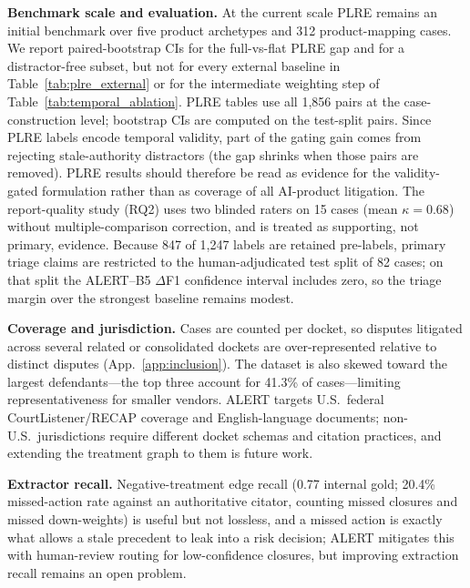 \textbf{Benchmark scale and evaluation.} At the current scale PLRE remains an initial benchmark over five product archetypes and 312 product-mapping cases. We report paired-bootstrap CIs for the full-vs-flat PLRE gap and for a distractor-free subset, but not for every external baseline in Table~\ref{tab:plre_external} or for the intermediate weighting step of Table~\ref{tab:temporal_ablation}. PLRE tables use all 1{,}856 pairs at the case-construction level; bootstrap CIs are computed on the test-split pairs. Since PLRE labels encode temporal validity, part of the gating gain comes from rejecting stale-authority distractors (the gap shrinks when those pairs are removed). PLRE results should therefore be read as evidence for the validity-gated formulation rather than as coverage of all AI-product litigation. The report-quality study (RQ2) uses two blinded raters on 15 cases (mean $\kappa{=}0.68$) without multiple-comparison correction, and is treated as supporting, not primary, evidence. Because 847 of 1{,}247 labels are retained pre-labels, primary triage claims are restricted to the human-adjudicated test split of 82 cases; on that split the ALERT--B5 $\Delta$F1 confidence interval includes zero, so the triage margin over the strongest baseline remains modest.

\textbf{Coverage and jurisdiction.} Cases are counted per docket, so disputes litigated across several related or consolidated dockets are over-represented relative to distinct disputes (App.~\ref{app:inclusion}). The dataset is also skewed toward the largest defendants---the top three account for 41.3\% of cases---limiting representativeness for smaller vendors. ALERT targets U.S.\ federal CourtListener/RECAP coverage and English-language documents; non-U.S.\ jurisdictions require different docket schemas and citation practices, and extending the treatment graph to them is future work.

\textbf{Extractor recall.} Negative-treatment edge recall (0.77 internal gold; 20.4\% missed-action rate against an authoritative citator, counting missed closures and missed down-weights) is useful but not lossless, and a missed action is exactly what allows a stale precedent to leak into a risk decision; ALERT mitigates this with human-review routing for low-confidence closures, but improving extraction recall remains an open problem.
